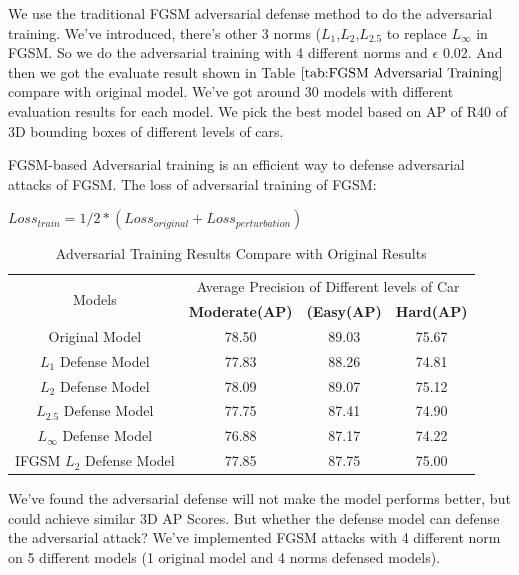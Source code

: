 We use the traditional FGSM adversarial defense method to do the adversarial training. We've introduced, there's other 3 norms (\(L_{1}\),\(L_{2}\),\(L_{2.5}\) to replace \(L_{\infty}\) in FGSM. So we do the adversarial training with 4 different norms and \(\epsilon\) 0.02. And then we got the evaluate result shown in Table \(\ref{tab:FGSM Adversarial Training}\) compare with original model. We've got around 30 models with different evaluation results for each model. We pick the best model based on AP of R40 of 3D bounding boxes of different levels of cars.

FGSM-based Adversarial training is an efficient way to defense adversarial attacks of FGSM. The loss of adversarial training of FGSM:
\begin{center}
          \(Loss_{train} = 1/2*(Loss_{original}+Loss_{perturbation}) \)
\end{center}
 \begin{table}[!htbp]
  \begin{center}
    
    \begin{tabular}{|c|c|c|c|} %
      \hline
      \multirow{2}{*}{Models} & \multicolumn{3}{c|}{Average Precision of Different levels of Car}\\
    \cline{2-4}
       &\textbf{Moderate(AP)} & \textbf{(Easy(AP)}& \textbf{Hard(AP)}\\
      \hline
      Original Model & 78.50 & 89.03 & 75.67\\
      \(L_{1}\) Defense Model &  77.83 & 88.26& 74.81\\
      \(L_{2}\) Defense Model & 78.09 & 89.07&75.12\\
      \(L_{2.5}\) Defense Model & 77.75 & 87.41&74.90\\
      \(L_{\infty}\) Defense Model & 76.88 & 87.17&74.22\\
      IFGSM \(L_{2}\) Defense Model & 77.85 & 87.75&75.00\\
    \hline
    \end{tabular}
\caption{Adversarial Training Results Compare with Original Results}
  \end{center}
  \label{tab:FGSM Adversarial Training}
\end{table}

We've found the adversarial defense will not make the model performs better, but could achieve similar 3D AP Scores. But whether the defense model can defense the adversarial attack? We've implemented FGSM attacks with 4 different norm on 5 different models (1 original model and 4 norms defensed models).

